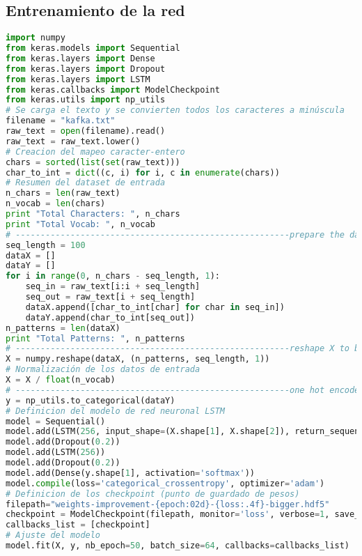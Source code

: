 \subsection{Entrenamiento de la red}
\begin{lstlisting}[language=Python]
import numpy
from keras.models import Sequential
from keras.layers import Dense
from keras.layers import Dropout
from keras.layers import LSTM
from keras.callbacks import ModelCheckpoint
from keras.utils import np_utils
# Se carga el texto y se convierten todos los caracteres a minúscula
filename = "kafka.txt"
raw_text = open(filename).read()
raw_text = raw_text.lower()
# Creacion del mapeo caracter-entero
chars = sorted(list(set(raw_text)))
char_to_int = dict((c, i) for i, c in enumerate(chars))
# Resumen del dataset de entrada
n_chars = len(raw_text)
n_vocab = len(chars)
print "Total Characters: ", n_chars
print "Total Vocab: ", n_vocab
# -------------------------------------------------------prepare the dataset of input to output pairs encoded as integers
seq_length = 100
dataX = []
dataY = []
for i in range(0, n_chars - seq_length, 1):
	seq_in = raw_text[i:i + seq_length]
	seq_out = raw_text[i + seq_length]
	dataX.append([char_to_int[char] for char in seq_in])
	dataY.append(char_to_int[seq_out])
n_patterns = len(dataX)
print "Total Patterns: ", n_patterns
# -------------------------------------------------------reshape X to be [samples, time steps, features]
X = numpy.reshape(dataX, (n_patterns, seq_length, 1))
# Normalización de los datos de entrada
X = X / float(n_vocab)
# -------------------------------------------------------one hot encode the output variable
y = np_utils.to_categorical(dataY)
# Definicion del modelo de red neuronal LSTM
model = Sequential()
model.add(LSTM(256, input_shape=(X.shape[1], X.shape[2]), return_sequences=True))
model.add(Dropout(0.2))
model.add(LSTM(256))
model.add(Dropout(0.2))
model.add(Dense(y.shape[1], activation='softmax'))
model.compile(loss='categorical_crossentropy', optimizer='adam')
# Definicion de los checkpoint (punto de guardado de pesos)
filepath="weights-improvement-{epoch:02d}-{loss:.4f}-bigger.hdf5"
checkpoint = ModelCheckpoint(filepath, monitor='loss', verbose=1, save_best_only=True, mode='min')
callbacks_list = [checkpoint]
# Ajuste del modelo
model.fit(X, y, nb_epoch=50, batch_size=64, callbacks=callbacks_list)
\end{lstlisting}


